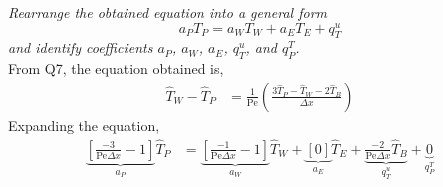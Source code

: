 
\textit{Rearrange the obtained equation into a general form}
\[
    a_P T_P = a_W T_W + a_E T_E + q_{T}^{u}
\]
\textit{and identify coefficients $a_P$, $a_W$, $a_E$, $q_{T}^{u}$, and $q_{P}^{T}$.}\\

From Q7, the equation obtained is,
\begin{align*}
    \hat{T}_W - \hat{T}_P &= \frac{1}{\text{Pe}} \left(\frac{3 \hat{T}_P - \hat{T}_W - 2 \hat{T}_B}{\Delta x}\right)
\end{align*}
Expanding the equation,
\begin{align*}
    \underbrace{\left[\frac{-3}{\text{Pe} \Delta x} -1\right]}_{a_P}\hat{T}_P &= \underbrace{\left[\frac{-1}{\text{Pe} \Delta x} -1\right]}_{a_W}\hat{T}_W + \underbrace{[0]}_{a_E}\hat{T}_E + \underbrace{\frac{-2}{\text{Pe} \Delta x} \hat{T}_B}_{q_{T}^{u}} + \underbrace{0}_{q_{P}^{T}}
\end{align*}